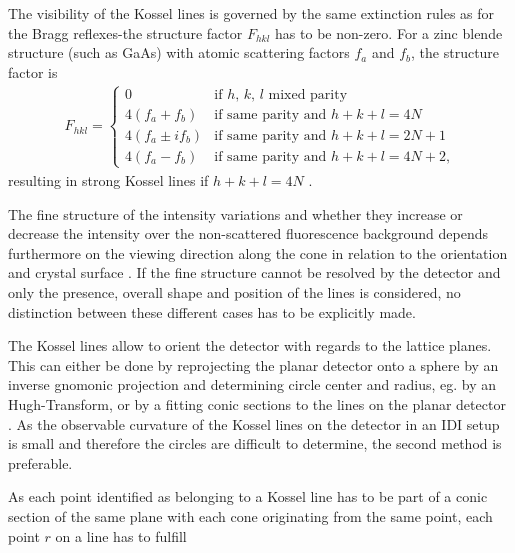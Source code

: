 The visibility of the Kossel lines is governed by the same extinction rules as for the Bragg reflexes-the structure factor $F_{hkl}$ has to be non-zero. For a zinc blende structure (such as GaAs) with atomic scattering factors $f_a$ and $f_b$, the structure factor is
\begin{align}
F_{hkl} = \begin{cases}
0 & \text{if $h$, $k$, $l$ mixed parity}\\
4(f_a+f_b) & \text{if same parity and $h+k+l = 4 N$} \\
4(f_a\pm i f_b)& \text{if same parity and $h+k+l = 2 N+1$} \\
4(f_a-f_b) & \text{if same parity and $h+k+l = 4 N+2$,}
\end{cases}
\end{align}
resulting in strong Kossel lines if $h+k+l=4N$ \cite{reimer2013}.

The fine structure of the intensity variations and whether they increase or decrease the intensity over the non-scattered fluorescence background depends furthermore on the viewing direction along the cone in relation to the orientation and crystal surface \cite{faigel2016}. If the fine structure cannot be resolved by the detector and only the presence, overall shape and position of the lines is considered, no distinction between these different cases has to be explicitly made.

The Kossel lines allow to orient the detector with regards to the lattice planes. This can either be done by reprojecting the planar detector onto a sphere by an inverse gnomonic projection and determining circle center and radius, eg. by an Hugh-Transform, or by a fitting conic sections to the lines on the planar detector \cite{morris1968,morawiec2016,faigel2016,herron2018}. As the observable curvature of the Kossel lines on the detector in an IDI setup is small and therefore the circles are difficult to determine, the second method is preferable. 

As each point identified as belonging to a Kossel line has to be part of a conic section of the same plane with each cone originating from the same point, each point $r$ on a line has to fulfill

